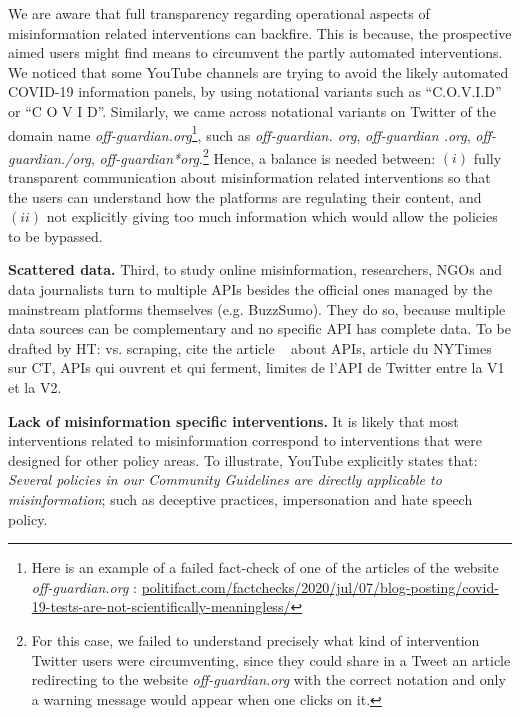 \documentclass{article}
\begin{document}
We are aware that full transparency regarding operational aspects of misinformation related interventions can backfire. This is because, the prospective aimed users might find means to circumvent the partly automated interventions. We noticed that some YouTube channels are trying to avoid the likely automated COVID-19 information panels, by using notational variants such as ``C.O.V.I.D'' or ``C O V I D''. Similarly, we came across notational variants on Twitter of the domain name {\it off-guardian.org}\footnote{Here is an example of a failed fact-check of one of the articles of the website {\it off-guardian.org} : \href{https://www.politifact.com/factchecks/2020/jul/07/blog-posting/covid-19-tests-are-not-scientifically-meaningless/}{politifact.com/factchecks/2020/jul/07/blog-posting/covid-19-tests-are-not-scientifically-meaningless/}}, such as {\it off-guardian. org}, {\it off-guardian .org}, {\it off-guardian./org}, {\it off-guardian*org}.\footnote{For this case, we failed to understand precisely what kind of intervention Twitter users were circumventing, since they could share in a Tweet an article redirecting to the website {\it off-guardian.org} with the correct notation and only a warning message would appear when one clicks on it.} Hence, a balance is needed between: $(i)$ fully transparent communication about misinformation related interventions so that the users can understand how the platforms are regulating their content, and $(ii)$ not explicitly giving too much information which would allow the policies to be bypassed.

\smallskip

{\bf Scattered data.} Third, to study online misinformation, researchers, NGOs and data journalists turn to multiple APIs besides the official ones managed by the mainstream platforms themselves (e.g. BuzzSumo). They do so, because multiple data sources can be complementary and no specific API has complete data. {\color{pink} To be drafted by HT:  vs. scraping, cite the article ~\cite{api} about APIs, article du NYTimes sur CT, APIs qui ouvrent et qui ferment, limites de l'API de Twitter entre la V1 et la V2.}


{\bf Lack of misinformation specific interventions.} It is likely that most interventions related to misinformation correspond to interventions that were designed for other policy areas. To illustrate, YouTube explicitly states that: {\it Several policies in our Community Guidelines are directly applicable to misinformation}; such as deceptive practices, impersonation and hate speech policy. 
\end{document}
